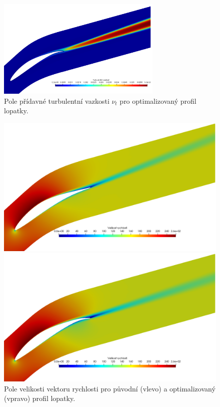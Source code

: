 \begin{figure}
	\includegraphics[width=0.7\textwidth]{img/nut_12.png}
	\caption{Pole přídavné turbulentní vazkosti $ \nu_t $ pro optimalizovaný profil lopatky.}
	\label{fig:ghs1_nut12}
\end{figure}

\begin{figure}
	\centering
	\begin{minipage}[t]{0.48\textwidth}
		\centering
		\includegraphics[width=1\textwidth]{img/magU_0.png}
	\end{minipage}
	\hfill
	\begin{minipage}[t]{0.48\textwidth}
		\centering
		\includegraphics[width=1\textwidth]{img/magU_12.png}
	\end{minipage}
	\caption{Pole velikosti vektoru rychlosti pro původní (vlevo) a optimalizovaný (vpravo) profil lopatky.}
	\label{fig:ghs1_U}
\end{figure}

